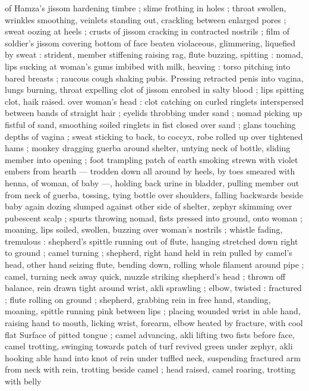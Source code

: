of Hamza's jissom hardening timbre ; slime frothing in holes ; throat 
swollen, wrinkles smoothing, veinlets standing out, crackling 
between enlarged pores ; sweat oozing at heels ; crusts of jissom 
cracking in contracted nostrils ; film of soldier's jissom covering 
bottom of face beaten violaceous, glimmering, liquefied by sweat : 
strident, member stiffening raising rag, flute buzzing, spitting : 
nomad, lips sucking at woman's gums imbibed with milk, heaving : 
torso pitching into bared breasts ; raucous cough shaking pubis. 
Pressing retracted penis into vagina, lungs burning, throat expelling 
clot of jissom enrobed in salty blood ; lips spitting clot, haik raised. 
over woman's head : clot catching on curled ringlets interspersed 
between bands of straight hair ; eyelids throbbing under sand ; 
nomad picking up fistful of sand, smoothing soiled ringlets in fist 
closed over sand ; glans touching depths of vagina ; sweat sticking 
to back, to coccyx, robe rolled up over tightened hams ; monkey 
dragging guerba around shelter, untying neck of bottle, sliding 
member into opening ; foot trampling patch of earth smoking strewn 
with violet embers from hearth --- trodden down all around by heels, 
by toes smeared with henna, of woman, of baby ---, holding back 
urine in bladder, pulling member out from neck of guerba, tossing, 
tying bottle over shoulders, falling backwards beside baby again 
dozing slumped against other side of shelter, zephyr skimming over 
pubescent scalp ; spurts throwing nomad, fists pressed into ground, 
onto woman ; moaning, lips soiled, swollen, buzzing over woman's 
nostrils ; whistle fading, tremulous : shepherd's spittle running out 
of flute, hanging stretched down right to ground ; camel turning ; 
shepherd, right hand held in rein pulled by camel's head, other hand 
seizing flute, bending down, rolling whole filament around pipe ; 
camel, turning neck away quick, muzzle striking shepherd's head ; 
thrown off balance, rein drawn tight around wrist, akli sprawling ; 
elbow, twisted : fractured ; flute rolling on ground ; shepherd, 
grabbing rein in free hand, standing, moaning, spittle running pink 
between lips ; placing wounded wrist in able hand, raising hand to 
mouth, licking wrist, forearm, elbow heated by fracture, with cool flat 
Surface of pitted tongue ; camel advancing, akli lifting two fists 
before face, camel trotting, swinging towards patch of turf revived 
green under zephyr, akli hooking able hand into knot of rein under 
tuffled neck, suspending fractured arm from neck with rein, trotting 
beside camel ; head raised, camel roaring, trotting with belly 
